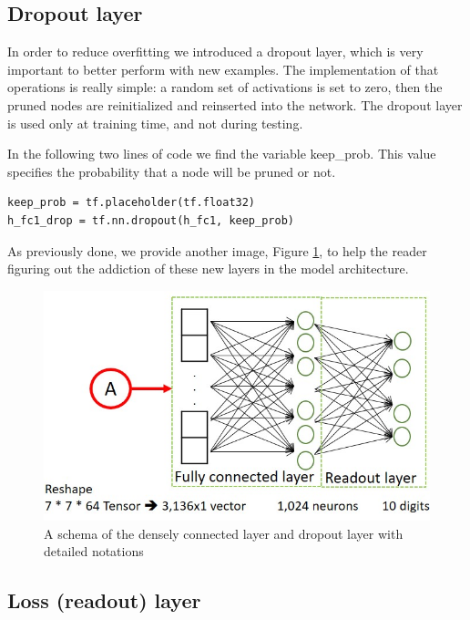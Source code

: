 \subsection{Dropout layer}

In order to reduce overfitting we introduced a dropout layer, which is very important to better perform with new examples. The implementation of that operations is really simple: a random set of activations is set to zero, then the pruned nodes are reinitialized and reinserted into the network. The dropout layer is used only at training time, and not during testing.

In the following two lines of code we find the variable keep\_prob. This value specifies the probability that a node will be pruned or not.

\begin{lstlisting}
keep_prob = tf.placeholder(tf.float32)
h_fc1_drop = tf.nn.dropout(h_fc1, keep_prob)
\end{lstlisting}

As previously done, we provide another image, Figure \ref{fig:other_layers}, to help the reader figuring out the addiction of these new layers in the model architecture.

\begin{figure}
	\caption{A schema of the densely connected layer and dropout layer with detailed notations}
	\label{fig:other_layers}
	\centering
	\includegraphics[width=1\textwidth]{Images/other_layers}
\end{figure}

\subsection{Loss (readout) layer}

